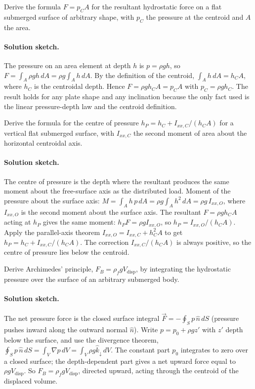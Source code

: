 \begin{exercise}
Derive the formula $F = p_C A$ for the resultant hydrostatic
force on a flat submerged surface of arbitrary shape, with $p_C$
the pressure at the centroid and $A$ the area.

\paragraph{Solution sketch.} The pressure on an area element at depth
$h$ is $p = \rho g h$, so $F = \int_A \rho g h\,dA = \rho g \int_A h\,dA$.
By the definition of the centroid, $\int_A h\,dA = h_C A$, where $h_C$ is
the centroidal depth. Hence $F = \rho g h_C A = p_C A$ with $p_C =
\rho g h_C$. The result holds for any plate shape and any inclination
because the only fact used is the linear pressure-depth law and the
centroid definition.
\end{exercise}

\begin{exercise}
Derive the formula for the centre of pressure $h_P = h_C +
I_{xx,C}/(h_C A)$ for a vertical flat submerged surface, with
$I_{xx,C}$ the second moment of area about the horizontal
centroidal axis.

\paragraph{Solution sketch.} The centre of pressure is the depth where
the resultant produces the same moment about the free-surface axis as
the distributed load. Moment of the pressure about the surface axis:
$M = \int_A h\,p\,dA = \rho g \int_A h^2\,dA = \rho g\, I_{xx,O}$, where
$I_{xx,O}$ is the second moment about the surface axis. The resultant
$F = \rho g h_C A$ acting at $h_P$ gives the same moment: $h_P F =
\rho g I_{xx,O}$, so $h_P = I_{xx,O}/(h_C A)$. Apply the parallel-axis
theorem $I_{xx,O} = I_{xx,C} + h_C^2 A$ to get $h_P = h_C +
I_{xx,C}/(h_C A)$. The correction $I_{xx,C}/(h_C A)$ is always positive,
so the centre of pressure lies below the centroid.
\end{exercise}

\begin{exercise}
Derive Archimedes' principle, $F_B = \rho_f g V_{\text{disp}}$,
by integrating the hydrostatic pressure over the surface of an
arbitrary submerged body.

\paragraph{Solution sketch.} The net pressure force is the closed
surface integral $\vec{F} = -\oint_S p\,\hat{n}\,dS$ (pressure pushes
inward along the outward normal $\hat{n}$). Write $p = p_0 + \rho g z'$
with $z'$ depth below the surface, and use the divergence theorem,
$\oint_S p\,\hat{n}\,dS = \int_V \nabla p\,dV = \int_V \rho g \hat{k}_{
\downarrow}\,dV$. The constant part $p_0$ integrates to zero over a
closed surface; the depth-dependent part gives a net upward force equal
to $\rho g V_{\text{disp}}$. So $F_B = \rho_f g V_{\text{disp}}$,
directed upward, acting through the centroid of the displaced volume.
\end{exercise}


